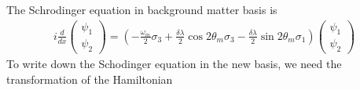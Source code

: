 \documentclass[letterpaper,12pt,english]{sphinxmanual}
\begin{document}
The Schrodinger equation in background matter basis is
\begin{equation*}
\begin{split}i\frac{d}{dx}\begin{pmatrix} \psi_{1} \\ \psi_2 \end{pmatrix} = \left(- \frac{\omega_m}{2} \sigma_3 + \frac{\delta \lambda}{2} \cos 2\theta_m \sigma_3 - \frac{\delta \lambda}{2} \sin 2 \theta_m \sigma_1 \right) \begin{pmatrix} \psi_{1} \\ \psi_2 \end{pmatrix}\end{split}
\end{equation*}
To write down the Schodinger equation in the new basis, we need the transformation of the Hamiltonian
\end{document}
